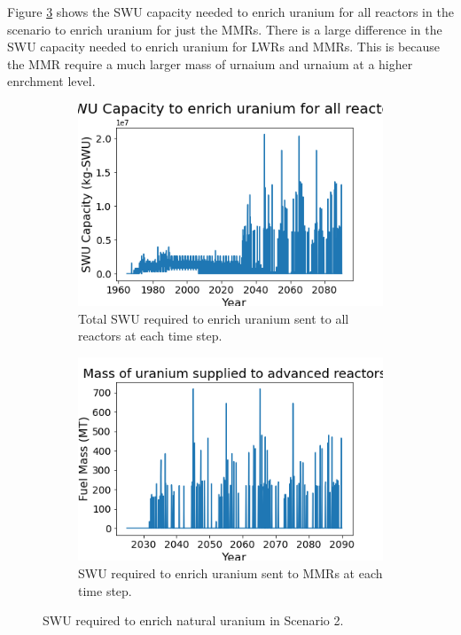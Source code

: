 Figure \ref{fig:swu_2} shows the \gls{SWU} capacity needed to 
enrich uranium for all reactors in the scenario to enrich uranium for 
just the \glspl{MMR}. There is a large difference in the \gls{SWU} 
capacity needed to enrich uranium for \glspl{LWR} and \glspl{MMR}. This 
is because the \gls{MMR} require a much larger mass of urnaium and 
urnaium at a higher enrchment level. 


\begin{figure}
    \centering
    \begin{subfigure}{0.4\textwidth}
        \centering
        \includegraphics[scale=0.3]{figures/totalswu_scenarios_2.png}
        \caption{Total \gls{SWU} required to enrich uranium sent to all reactors at each time step.}
        \label{fig:totalswu_2}
    \end{subfigure}
    \begin{subfigure}{0.4\textwidth}
        \centering
        \includegraphics[scale=0.3]{figures/advancedRX_fuelsupply_scenarios_2.png}
        \caption{\gls{SWU} required to enrich uranium sent to \glspl{MMR} at each time step.}
        \label{fig:haleuswu_2}
    \end{subfigure}
    \caption{\gls{SWU} required to enrich natural uranium in Scenario 2.}
    \label{fig:swu_2}
\end{figure}

